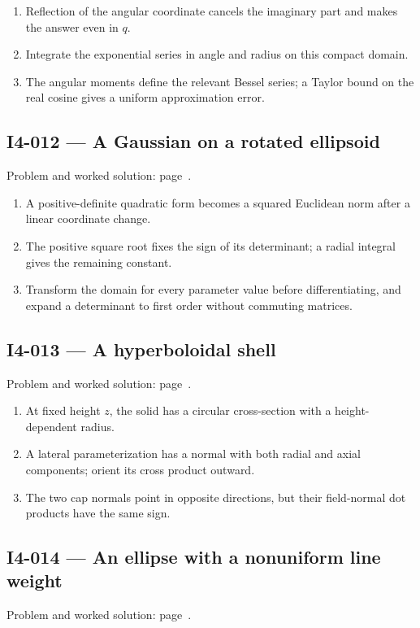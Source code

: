 \documentclass[11pt,oneside,openany]{book}
\begin{document}
\begin{enumerate}
\item Reflection of the angular coordinate cancels the imaginary part and makes the answer even in \(q\).
\item Integrate the exponential series in angle and radius on this compact domain.
\item The angular moments define the relevant Bessel series; a Taylor bound on the real cosine gives a uniform approximation error.
\end{enumerate}
\subsection*{I4-012 --- A Gaussian on a rotated ellipsoid}
\label{hints:I4-012}
Problem and worked solution: page~\pageref{problem:I4-012}.

\begin{enumerate}
\item A positive-definite quadratic form becomes a squared Euclidean norm after a linear coordinate change.
\item The positive square root fixes the sign of its determinant; a radial integral gives the remaining constant.
\item Transform the domain for every parameter value before differentiating, and expand a determinant to first order without commuting matrices.
\end{enumerate}
\subsection*{I4-013 --- A hyperboloidal shell}
\label{hints:I4-013}
Problem and worked solution: page~\pageref{problem:I4-013}.

\begin{enumerate}
\item At fixed height \(z\), the solid has a circular cross-section with a height-dependent radius.
\item A lateral parameterization has a normal with both radial and axial components; orient its cross product outward.
\item The two cap normals point in opposite directions, but their field-normal dot products have the same sign.
\end{enumerate}
\subsection*{I4-014 --- An ellipse with a nonuniform line weight}
\label{hints:I4-014}
Problem and worked solution: page~\pageref{problem:I4-014}.
\end{document}
